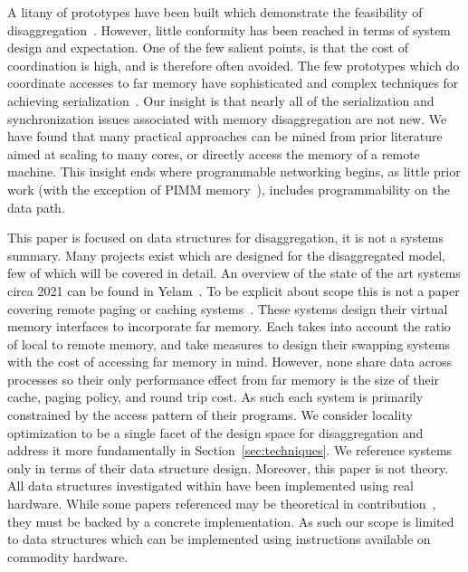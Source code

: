 
A litany of prototypes have been built which demonstrate the feasibility of
disaggregation~\cite{infiniswap,fastswap,leap,legoos,aifm,kona,reigons,software-far,lite,semeru}.
However, little conformity has been reached in terms of system design and
expectation. One of the few salient points, is that the cost of coordination is
high, and is therefore often avoided. The few prototypes which do coordinate
accesses to far memory have sophisticated and complex techniques for achieving
serialization~\cite{clover,one-sided-hash,sherman,ford}. Our insight is that nearly all of
the serialization and synchronization issues associated with memory
disaggregation are not new. We have found that many practical approaches can be
mined from prior literature aimed at scaling to many cores, or directly access
the memory of a remote machine. This insight ends where programmable networking
begins, as little prior work (with the exception of PIMM memory~\cite{near-memory-structs}),
includes programmability on the data path.

This paper is focused on data structures for disaggregation, it is not a systems
summary.  Many projects exist which are designed for the disaggregated model,
few of which will be covered in detail. An overview of the state of the art
systems circa 2021 can be found in Yelam~\cite{yelam2022systems}.
To be explicit about scope this is not a paper covering remote paging or caching
systems~\cite{fastswap,kona,infiniswap,leap,legoos}. These systems design their
virtual memory interfaces to incorporate far memory. Each takes into account the
ratio of local to remote memory, and take measures to design their swapping
systems with the cost of accessing far memory in mind.  However, none share data
across processes so their only performance effect from far memory is the size of
their cache, paging policy, and round trip cost. As such each system is
primarily constrained by the access pattern of their programs. We consider
locality optimization to be a single facet of the design space for
disaggregation and address it more fundamentally in
Section~\ref{sec:techniques}. We reference systems only in terms of their data
structure design.
Moreover, this paper is not theory. All data structures investigated within have been
implemented using real hardware. While some papers referenced may be theoretical
in contribution~\cite{flat-combine,hopscotch,linked-list-cas}, they must be
backed by a concrete implementation. As such our scope is limited to data
structures which can be implemented using instructions available on commodity
hardware.

